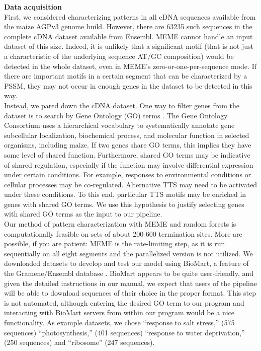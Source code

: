 \documentclass[12pt,letterpaper]{report}
\begin{document}
{\Large\textbf{Data acquisition}}\\

First, we considered characterizing patterns in all cDNA sequences available from the maize AGPv3 genome build. However, there are 63235 such sequences in the complete cDNA dataset available from Ensembl. MEME cannot handle an input dataset of this size. Indeed, it is unlikely that a significant motif (that is not just a characteristic of the underlying sequence AT/GC composition) would be detected in the whole dataset, even in MEME’s zero-or-one-per-sequence mode. If there are important motifs in a certain segment that can be characterized by a PSSM, they may not occur in enough genes in the dataset to be detected in this way.\\

\indent Instead, we pared down the cDNA dataset. One way to filter genes from the dataset is to search by Gene Ontology (GO) terms \cite{go}. The Gene Ontology Consortium uses a hierarchical vocabulary to systematically annotate gene subcellular localization, biochemical process, and molecular function in selected organisms, including maize. If two genes share GO terms, this implies they have some level of shared function. Furthermore, shared GO terms may be indicative of shared regulation, especially if the function may involve differential expression under certain conditions. For example, responses to environmental conditions or cellular processes may be co-regulated. Alternative TTS may need to be activated under these conditions. To this end, particular TTS motifs may be enriched in genes with shared GO terms. We use this hypothesis to justify selecting genes with shared GO terms as the input to our pipeline. \\

\indent Our method of pattern characterization with MEME and random forests is computationally feasible on sets of about 200-600 termination sites. More are possible, if you are patient: MEME is the rate-limiting step, as it is run sequentially on all eight segments and the parallelized version is not utilized. We downloaded datasets to develop and test our model using BioMart, a feature of the Gramene/Ensembl database \cite{biomart}. BioMart appears to be quite user-friendly, and given the detailed instructions in our manual, we expect that users of the pipeline will be able to download sequences of their choice in the proper format. This step is not automated, although entering the desired GO term to our program and interacting with BioMart servers from within our program would be a nice functionality. As example datasets, we chose ``response to salt stress,'' (575 sequences) ``photosynthesis,'' (401 sequences) ``response to water deprivation,'' (250 sequences) and ``ribosome'' (247 sequences).\\
\end{document}
